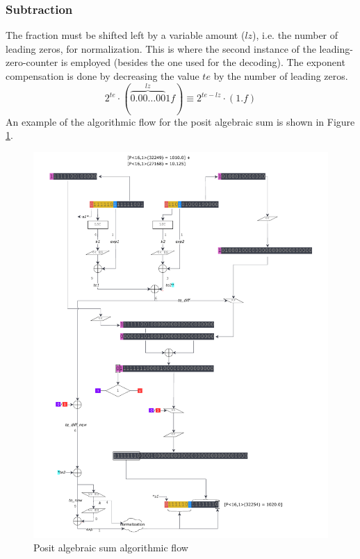     \subsubsection{Subtraction}
    The fraction must be shifted left by a variable amount ($lz$), i.e. the number of leading zeros, for normalization. This is where the second instance of the leading-zero-counter is employed (besides the one used for the decoding). The exponent compensation is done by decreasing the value $te$ by the number of leading zeros.
    $$
    2^{te} \cdot (\overbrace{0.00\dots00}^{lz}1f) \equiv 2^{te - lz} \cdot (1.f)
    $$
An example of the algorithmic flow for the posit algebraic sum is shown in Figure \ref{fig:additionflow}.
\begin{figure}
    \begin{center}
    \includegraphics[width=\textwidth]{figures/addition_flow.pdf}
    \caption{Posit algebraic sum algorithmic flow}
    \label{fig:additionflow}
    \end{center}
\end{figure}


